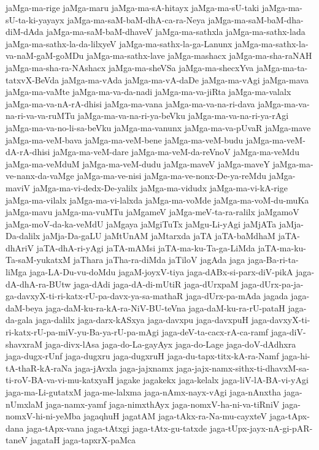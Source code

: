 {jaMga-ma-rige
jaMga-maru
jaMga-ma-sA-hitayx
jaMga-ma-sU-taki
jaMga-ma-sU-ta-ki-yayayx
jaMga-ma-saM-baM-dhA-ca-ra-Neya
jaMga-ma-saM-baM-dha-diM-dAda
jaMga-ma-saM-baM-dhaveV
jaMga-ma-sathxla
jaMga-ma-sathx-lada
jaMga-ma-sathx-la-da-lilxyeV
jaMga-ma-sathx-la-ga-Lanunx
jaMga-ma-sathx-la-va-naM-gaM-goMDu
jaMga-ma-sathx-lave
jaMga-mashacx
jaMga-ma-sha-raNAH
jaMga-ma-sha-ra-NAshacx
jaMga-ma-sheVSa
jaMga-ma-shecxYva
jaMga-ma-ta-tatxvX-BeVda
jaMga-ma-vAda
jaMga-ma-vA-daDe
jaMga-ma-vAgi
jaMga-mava
jaMga-ma-vaMte
jaMga-ma-va-da-nadi
jaMga-ma-va-jiRta
jaMga-ma-valalx
jaMga-ma-va-nA-rA-dhisi
jaMga-ma-vana
jaMga-ma-va-na-ri-dava
jaMga-ma-va-na-ri-va-va-ruMTu
jaMga-ma-va-na-ri-ya-beVku
jaMga-ma-va-na-ri-ya-rAgi
jaMga-ma-va-no-li-sa-beVku
jaMga-ma-vanunx
jaMga-ma-va-pUvaR
jaMga-mave
jaMga-ma-veM-bava
jaMga-ma-veM-bene
jaMga-ma-veM-budu
jaMga-ma-veM-dA-rA-dhisi
jaMga-ma-veM-dare
jaMga-ma-veM-da-reVnoV
jaMga-ma-veMdu
jaMga-ma-veMduM
jaMga-ma-veM-dudu
jaMga-maveV
jaMga-maveY
jaMga-ma-ve-nanx-da-vaMge
jaMga-ma-ve-nisi
jaMga-ma-ve-nonx-De-ya-reMdu
jaMga-maviV
jaMga-ma-vi-dedx-De-yalilx
jaMga-ma-vidudx
jaMga-ma-vi-kA-rige
jaMga-ma-vilalx
jaMga-ma-vi-lalxda
jaMga-ma-voMde
jaMga-ma-voM-du-muKa
jaMga-mavu
jaMga-ma-vuMTu
jaMgameV
jaMga-meV-ta-ra-ralilx
jaMgamoV
jaMga-moV-da-ka-veMdU
jaMgaya
jaMgiTuTx
jaMgu-Li-yAgi
jaMjATa
jaMja-Da-dalilx
jaMja-Da-gaLU
jaMtUnAM
jaMtarxda
jaTA
jaTA-baMdhaM
jaTA-dhAriV
jaTA-dhA-ri-yAgi
jaTA-mAMsi
jaTA-ma-ku-Ta-ga-LiMda
jaTA-ma-ku-Ta-saM-yukatxM
jaThara
jaTha-ra-diMda
jaTiloV
jagAda
jaga
jaga-Ba-ri-ta-liMga
jaga-LA-Du-vu-doMdu
jagaM-joyxV-tiya
jaga-dABx-si-parx-diV-pikA
jaga-dA-dhA-ra-BUtw
jaga-dAdi
jaga-dA-di-mUtiR
jaga-dUrxpaM
jaga-dUrx-pa-ja-ga-davxyX-ti-ri-katx-rU-pa-davx-ya-sa-mathaR
jaga-dUrx-pa-mAda
jagada
jaga-daM-beya
jaga-daM-ku-ra-kA-ra-NiV-BU-teVna
jaga-daM-ku-ra-rU-pataH
jaga-da-gala
jaga-dalilx
jaga-darx-kASxya
jaga-davxpu
jaga-davxpuH
jaga-davxyX-ti-ri-katx-rU-pa-miV-yu-Ba-ya-rU-pa-mAgi
jaga-deV-ta-cacx-rA-ca-ramf
jaga-diV-shavxraM
jaga-divx-lAsa
jaga-do-La-gayAyx
jaga-do-Lage
jaga-doV-dAdhxra
jaga-dugx-rUnf
jaga-dugxru
jaga-dugxruH
jaga-du-tapx-titx-kA-ra-Namf
jaga-hi-tA-thaR-kA-raNa
jaga-jAvxla
jaga-jajxnamx
jaga-jajx-namx-sithx-ti-dhavxM-sa-ti-roV-BA-va-vi-mu-katxyaH
jagake
jagakekx
jaga-kelalx
jaga-liV-lA-BA-vi-yAgi
jaga-ma-Li-gutatxM
jaga-me-lalxma
jaga-nAmx-nayx-vAgi
jaga-nAnxtha
jaga-nUmxlaM
jaga-namx-yamf
jaga-nimxthAyx
jaga-nomxV-ha-ni-va-tiRniV
jaga-nomxV-hi-ni-yeMba
jagaqhuH
jagatAM
jaga-tAkx-ra-Na-mu-cayxteV
jaga-tApx-dana
jaga-tApx-vana
jaga-tAtxgi
jaga-tAtx-gu-tatxde
jaga-tUpx-jayx-nA-gi-pAR-taneV
jagataH
jaga-tapxrX-paMca
}
